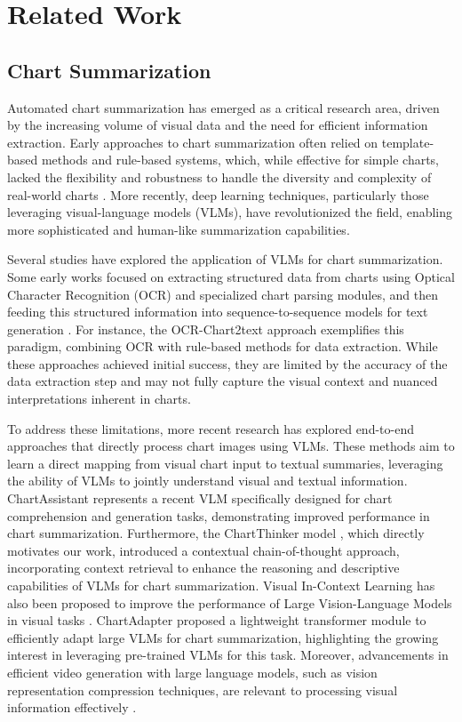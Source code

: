 \section{Related Work}
\subsection{Chart Summarization}

Automated chart summarization has emerged as a critical research area, driven by the increasing volume of visual data and the need for efficient information extraction. Early approaches to chart summarization often relied on template-based methods and rule-based systems, which, while effective for simple charts, lacked the flexibility and robustness to handle the diversity and complexity of real-world charts \cite{TemplateChartSum}. More recently, deep learning techniques, particularly those leveraging visual-language models (VLMs), have revolutionized the field, enabling more sophisticated and human-like summarization capabilities.

Several studies have explored the application of VLMs for chart summarization. Some early works focused on extracting structured data from charts using Optical Character Recognition (OCR) and specialized chart parsing modules, and then feeding this structured information into sequence-to-sequence models for text generation \cite{OCRChartSum,StructChartSum}. For instance, the OCR-Chart2text approach \cite{OCRChart2text} exemplifies this paradigm, combining OCR with rule-based methods for data extraction. While these approaches achieved initial success, they are limited by the accuracy of the data extraction step and may not fully capture the visual context and nuanced interpretations inherent in charts.

To address these limitations, more recent research has explored end-to-end approaches that directly process chart images using VLMs. These methods aim to learn a direct mapping from visual chart input to textual summaries, leveraging the ability of VLMs to jointly understand visual and textual information. ChartAssistant \cite{ChartAssistant2024} represents a recent VLM specifically designed for chart comprehension and generation tasks, demonstrating improved performance in chart summarization.  Furthermore, the ChartThinker model \cite{ChartThinker2024}, which directly motivates our work, introduced a contextual chain-of-thought approach, incorporating context retrieval to enhance the reasoning and descriptive capabilities of VLMs for chart summarization.  Visual In-Context Learning has also been proposed to improve the performance of Large Vision-Language Models in visual tasks \cite{zhou2024visual}. ChartAdapter \cite{ChartAdapter2024} proposed a lightweight transformer module to efficiently adapt large VLMs for chart summarization, highlighting the growing interest in leveraging pre-trained VLMs for this task.  Moreover, advancements in efficient video generation with large language models, such as vision representation compression techniques, are relevant to processing visual information effectively \cite{zhou2024less}.

